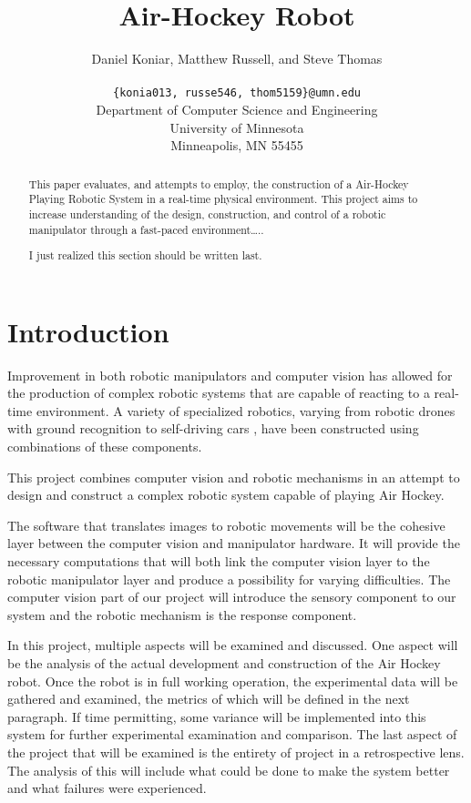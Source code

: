 \documentclass[letterpaper, 12 pt, conference]{ieeeconf}
\title{\bf
Air-Hockey Robot
}
\author{\parbox{5 in}{\centering Daniel Koniar, Matthew Russell, and Steve Thomas}\\
  {\tt\small \{konia013, russe546, thom5159\}@umn.edu}\\
  Department of Computer Science and Engineering\\
  University of Minnesota\\
  Minneapolis, MN 55455\\
}
\begin{document}
\maketitle
\thispagestyle{empty}
\pagestyle{empty}

\begin{abstract}
This paper evaluates, and attempts to employ, the construction of a Air-Hockey Playing Robotic System in a real-time physical environment.  This project aims to increase understanding of the design, construction, and control of a robotic manipulator through a fast-paced environment…..

I just realized this section should be written last.
\end{abstract}

\section{Introduction}
\label{introduction}
Improvement in both robotic manipulators and computer vision has allowed for the production of complex robotic systems that are capable of reacting to a real-time environment. A variety of specialized robotics, varying from robotic drones \cite{3dr} with ground recognition to self-driving cars \cite{googlecar}, have been constructed using combinations of these components.  

This project combines computer vision and robotic mechanisms in an attempt to design and construct a complex robotic system capable of playing Air Hockey. 

The software that translates images to robotic movements will be the cohesive layer between the computer vision and manipulator hardware. It will provide the necessary computations that will both link the computer vision layer to the robotic manipulator layer and produce a possibility for varying difficulties.  The computer vision part of our project will introduce the sensory component to our system and the robotic mechanism is the response component.

In this project, multiple aspects will be examined and discussed.  One aspect will be the analysis of the actual development and construction of the Air Hockey robot.  Once the robot is in full working operation, the experimental data will be gathered and examined, the metrics of which will be defined in the next paragraph.  If time permitting, some variance will be implemented into this system for further experimental examination and comparison.  The last aspect of the project that will be examined is the entirety of project in a retrospective lens.  The analysis of this will include what could be done to make the system better and what failures were experienced.
\end{document}
